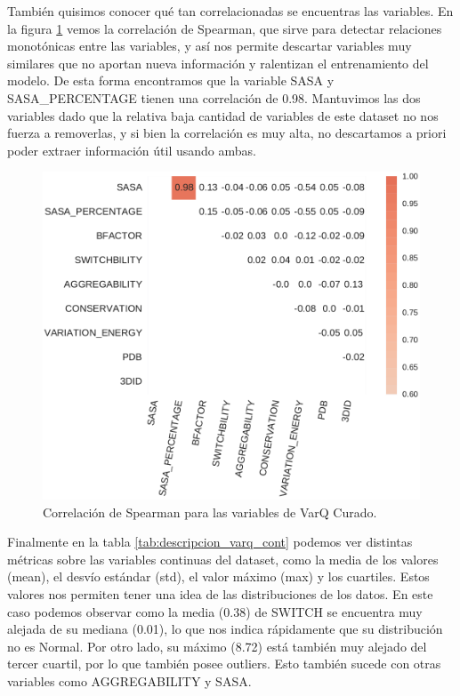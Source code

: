 También quisimos conocer qué tan correlacionadas se encuentras las variables. En la figura \ref{fig:varq_corrplot} vemos la correlación de Spearman, que sirve para detectar relaciones monotónicas entre las variables, y así nos permite descartar variables muy similares que no aportan nueva información y ralentizan el entrenamiento del modelo. De esta forma encontramos que la variable SASA y SASA\_PERCENTAGE tienen una correlación de 0.98. Mantuvimos las dos variables dado que la relativa baja cantidad de variables de este dataset no nos fuerza a removerlas, y si bien la correlación es muy alta, no descartamos a priori poder extraer información útil usando ambas.

\begin{figure}[H]
    \centering
    \includegraphics[scale=0.6]{documents/latex/figures/3/varq/varq_corrplot.pdf}
    \caption{Correlación de Spearman para las variables de VarQ Curado.}
    \label{fig:varq_corrplot}
\end{figure}

Finalmente en la tabla \ref{tab:descripcion_varq_cont} podemos ver distintas métricas sobre las variables continuas del dataset, como la media de los valores (mean), el desvío estándar (std), el valor máximo (max) y los cuartiles. Estos valores nos permiten tener una idea de las distribuciones de los datos. En este caso podemos observar como la media (0.38) de SWITCH se encuentra muy alejada de su mediana (0.01), lo que nos indica rápidamente que su distribución no es Normal. Por otro lado, su máximo (8.72) está también muy alejado del tercer cuartil, por lo que también posee outliers. Esto también sucede con otras variables como AGGREGABILITY y SASA.

